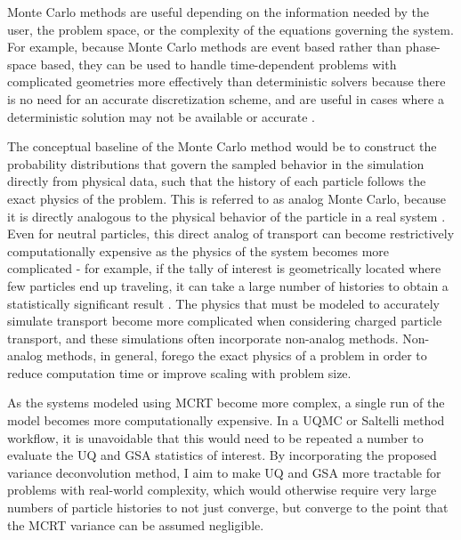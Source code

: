 Monte Carlo methods are useful depending on the information needed by the user, the problem space, or the complexity of the equations governing the system. For example, because Monte Carlo methods are event based rather than phase-space based, they can be used to handle time-dependent problems with complicated geometries more effectively than deterministic solvers because there is no need for an accurate discretization scheme, and are useful in cases where a deterministic solution may not be available or accurate \cite{mcnp}. 

The conceptual baseline of the Monte Carlo method would be to construct the probability distributions that govern the sampled behavior in the simulation directly from physical data, such that the history of each particle follows the exact physics of the problem. This is referred to as analog Monte Carlo, because it is directly analogous to the physical behavior of the particle in a real system \cite{mcnp}. Even for neutral particles, this direct analog of transport can become restrictively computationally expensive as the physics of the system becomes more complicated - for example, if the tally of interest is geometrically located where few particles end up traveling, it can take a large number of histories to obtain a statistically significant result \cite{mcnp}. The physics that must be modeled to accurately simulate transport become more complicated when considering charged particle transport, and these simulations often incorporate non-analog methods. Non-analog methods, in general, forego the exact physics of a problem in order to reduce computation time or improve scaling with problem size. 

As the systems modeled using MCRT become more complex, a single run of the model becomes more computationally expensive. In a UQMC or Saltelli method workflow, it is unavoidable that this would need to be repeated a number to evaluate the UQ and GSA statistics of interest. By incorporating the proposed variance deconvolution method, I aim to make UQ and GSA more tractable for problems with real-world complexity, which would otherwise require very large numbers of particle histories to not just converge, but converge to the point that the MCRT variance can be assumed negligible.

